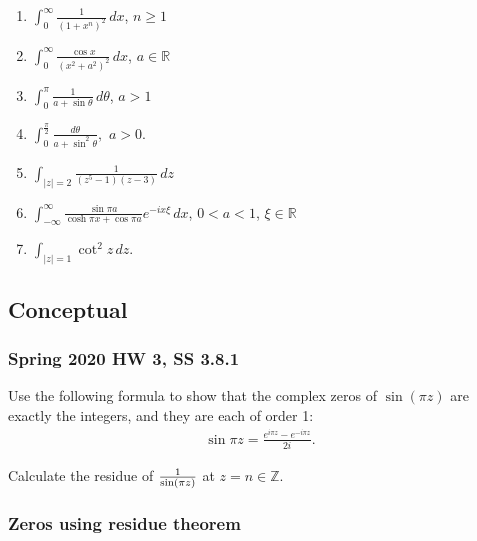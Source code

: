 \begin{enumerate}
\def\labelenumi{(\roman{enumi})}
\item
  \(\displaystyle \int_0^\infty \frac{1}{(1 + x^n)^2} \, dx\),
  \(n \geq 1\)
\item
  \(\displaystyle \int_0^\infty \frac{\cos x}{(x^2 + a^2)^2} \, dx\),
  \(a \in \mathbb R\)
\item
  \(\displaystyle \int_0^\pi \frac{1}{a + \sin \theta} \, d \theta\),
  \(a>1\)
\item
  \(\displaystyle \int_0^{\frac{\pi}{2}} \frac{d \theta}{a+ \sin ^2 \theta},\)
  \(a >0\).
\item
  \(\displaystyle \int_{|z|=2} \frac{1}{(z^{5} -1) (z-3)} \, dz\)
\item
  \(\displaystyle \int_{- \infty}^{\infty} \frac{\sin \pi a}{\cosh \pi x + \cos \pi a} e^{- i x \xi} \, d x\),
  \(0< a <1\), \(\xi \in \mathbb R\)
\item
  \(\displaystyle \int_{|z| = 1} \cot^2 z \, dz\).
\end{enumerate}

\hypertarget{conceptual}{%
\subsection{Conceptual}\label{conceptual}}

\hypertarget{spring-2020-hw-3-ss-3.8.1}{%
\subsubsection{Spring 2020 HW 3, SS
3.8.1}\label{spring-2020-hw-3-ss-3.8.1}}

Use the following formula to show that the complex zeros of
\(\sin(\pi z)\) are exactly the integers, and they are each of order 1:
\begin{align*}
\sin \pi z=\frac{e^{i \pi z}-e^{-i \pi z}}{2 i}
.\end{align*}

Calculate the residue of \({1\over \sin(\pi z)}\) at
\(z=n\in {\mathbb{Z}}\).

\hypertarget{zeros-using-residue-theorem}{%
\subsubsection{Zeros using residue
theorem}\label{zeros-using-residue-theorem}}

